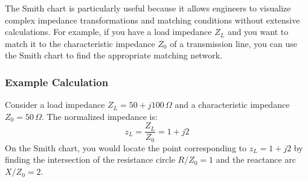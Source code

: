 The Smith chart is particularly useful because it allows engineers to visualize complex impedance transformations and matching conditions without extensive calculations. For example, if you have a load impedance \( Z_L \) and you want to match it to the characteristic impedance \( Z_0 \) of a transmission line, you can use the Smith chart to find the appropriate matching network.

\subsubsection*{Example Calculation}
Consider a load impedance \( Z_L = 50 + j100 \, \Omega \) and a characteristic impedance \( Z_0 = 50 \, \Omega \). The normalized impedance is:
\[
z_L = \frac{Z_L}{Z_0} = 1 + j2
\]
On the Smith chart, you would locate the point corresponding to \( z_L = 1 + j2 \) by finding the intersection of the resistance circle \( R/Z_0 = 1 \) and the reactance arc \( X/Z_0 = 2 \).

